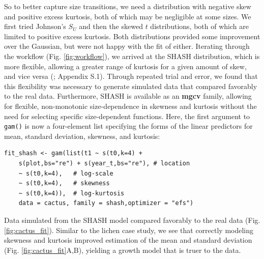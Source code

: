 \documentclass[12pt]{article}
\begin{document}
So to better capture size transitions, we need a distribution with negative skew and positive excess kurtosis, both of which may be negligible at some sizes.
We first tried Johnson's $S_{U}$ and then the skewed $t$ distributions, both of which are limited to positive excess kurtosis.
Both distributions provided some improvement over the Gaussian, but were not happy with the fit of either.
Iterating through the workflow (Fig. \ref{fig:workflow}), we arrived at the SHASH distribution, which is more flexible, 
allowing a greater range of kurtosis for a given amount of skew, and vice versa (\cite{jones-pewsey-2009}; Appendix S.1). 
Through repeated trial and error, we found that this flexibility was necessary to generate simulated data that compared favorably to the real data. 
Furthermore, SHASH is available as an \textbf{mgcv} family, allowing for flexible, non-monotonic size-dependence in skewness and kurtosis without the need for selecting specific size-dependent functions. 
Here, the first argument to \texttt{gam()} is now a four-element list specifying the forms of the linear predictors for mean, standard deviation, skewness, and kurtosis:
\begin{lstlisting}
fit_shash <- gam(list(t1 ~ s(t0,k=4) + 
    s(plot,bs="re") + s(year_t,bs="re"), # location 
    ~ s(t0,k=4),   # log-scale
    ~ s(t0,k=4),   # skewness
    ~ s(t0,k=4)),  # log-kurtosis
    data = cactus, family = shash,optimizer = "efs")
\end{lstlisting}

Data simulated from the SHASH model compared favorably to the real data (Fig. \ref{fig:cactus_fit}). 
Similar to the lichen case study, we see that correctly modeling skewness and kurtosis improved estimation of the mean and standard deviation (Fig. \ref{fig:cactus_fit}A,B), yielding a growth model that is truer to the data. 
\end{document}
